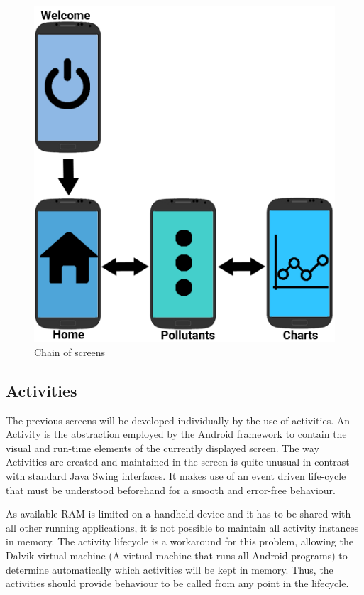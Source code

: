 \begin{figure}[H]
\begin{adjustbox}{width=.45\textwidth,center=\textwidth}
  \centering
  \includegraphics[scale=1]{images/screenChain.png}
\end{adjustbox}
  \caption[Chain of screens]{Chain of screens}
  \label{fig:chain_of_screens}
\end{figure}

\subsection{Activities}
The previous screens will be developed individually by the use of activities. An Activity is the abstraction employed by the Android framework to contain the visual and run-time elements of the currently displayed screen. The way Activities are created and maintained in the screen is quite unusual in contrast with standard Java Swing interfaces. It makes use of an event driven life-cycle that must be understood beforehand for a smooth and error-free behaviour. 

As available RAM is limited on a handheld device and it has to be shared with all other running applications, it is not possible to maintain all activity instances in memory. The activity lifecycle is a workaround for this problem, allowing the Dalvik virtual machine (A virtual machine that runs all Android programs) to determine automatically which activities will be kept in memory. Thus, the activities should provide behaviour to be called from any point in the lifecycle.

